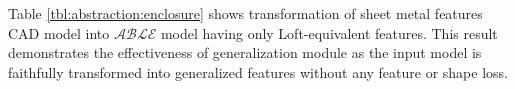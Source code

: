 
Table \ref{tbl:abstraction:enclosure} shows transformation of sheet metal features CAD model into $\mathcal{ABLE}$ model having only Loft-equivalent features. This result demonstrates the effectiveness of generalization module as the input model is faithfully transformed into generalized features without any feature or shape loss.
